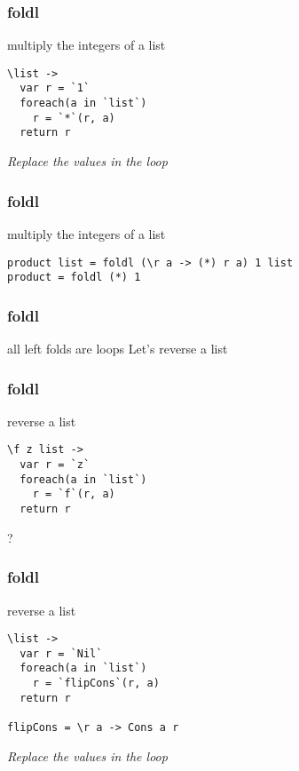 \begin{frame}[fragile]
\frametitle{foldl}
\begin{block}{multiply the integers of a list}
\begin{lstlisting}[style=haskell,basicstyle=\scriptsize\ttfamily,mathescape]
\list ->
  var r = `1`
  foreach(a in `list`)
    r = `*`(r, a)
  return r
\end{lstlisting}
\end{block}
\begin{center}
\LARGE
\emph{Replace the values in the loop}
\end{center}
\end{frame}

\begin{frame}[fragile]
\frametitle{foldl}
\begin{block}{multiply the integers of a list}
\begin{lstlisting}[style=haskell,basicstyle=\scriptsize\ttfamily,mathescape]
product list = foldl (\r a -> (*) r a) 1 list
product = foldl (*) 1
\end{lstlisting}
\end{block}
\end{frame}

\begin{frame}[fragile]
\frametitle{foldl}
\begin{block}{all left folds are loops}
Let's reverse a list
\end{block}
\end{frame}

\begin{frame}[fragile]
\frametitle{foldl}
\begin{block}{reverse a list}
\begin{lstlisting}[style=haskell,basicstyle=\scriptsize\ttfamily,mathescape]
\f z list ->
  var r = `z`
  foreach(a in `list`)
    r = `f`(r, a)
  return r
\end{lstlisting}
\end{block}
\begin{center}
\LARGE
?
\end{center}
\end{frame}

\begin{frame}[fragile]
\frametitle{foldl}
\begin{block}{reverse a list}
\begin{lstlisting}[style=haskell,basicstyle=\scriptsize\ttfamily,mathescape]
\list ->
  var r = `Nil`
  foreach(a in `list`)
    r = `flipCons`(r, a)
  return r

flipCons = \r a -> Cons a r
\end{lstlisting}
\end{block}
\begin{center}
\LARGE
\emph{Replace the values in the loop}
\end{center}
\end{frame}

